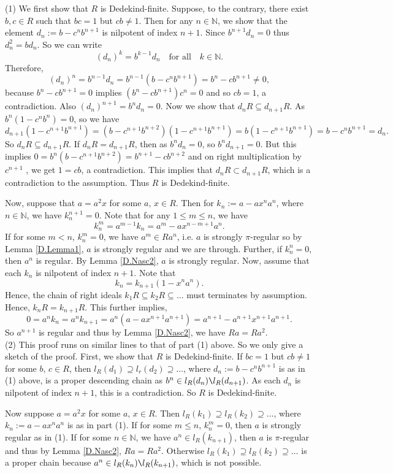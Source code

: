 \documentclass[12pt]{article}
\makeatletter
\theoremstyle{plain}
\theoremstyle{definition}
\renewenvironment{proof}[1][\proofname]{%
	\par\pushQED{\qed}%
	\normalfont %
	\topsep6\p@\@plus6\p@\relax
	\trivlist
	\item[\hskip\labelsep\bfseries #1\@addpunct{.}]%
}{%
	\popQED\endtrivlist\@endpefalse
}
\renewcommand{\proofname}{Proof}
\makeatother
\begin{document}
	\begin{proof}
		(1) We first show that $R$ is Dedekind-finite. Suppose, to the contrary, there exist $b,c \in R$ such that $bc = 1$ but $cb \neq 1$. Then for any $n \in \mathbb{N}$, we show that the element $d_n := b-c^nb^{n+1}$ is nilpotent of index $n+1$. Since $b^{n+1}d_n=0$ thus $d_n^2=bd_n$. So we can write $$(d_n)^k = b^{k-1}d_n  \quad \text{for all} \quad k \in \mathbb{N}.$$ Therefore, $$(d_{n})^n = b^{n-1}d_n = b^{n-1}(b-c^nb^{n+1}) = b^n - cb^{n+1} \neq 0,$$ because $b^n - cb^{n+1} = 0$ implies $(b^n - cb^{n+1})c^n = 0$ and so $cb = 1$, a contradiction. Also $(d_{n})^{n+1} = b^nd_n = 0$. Now we show that $d_nR \subseteq d_{n+1}R$. As $b^n(1-c^nb^n) = 0$, so we have  $$d_{n+1}(1-c^{n+1}b^{n+1}) = (b-c^{n+1}b^{n+2})(1-c^{n+1}b^{n+1}) = b(1-c^{n+1}b^{n+1}) = b - c^{n}b^{n+1} = d_n.$$ So $d_nR \subseteq d_{n+1}R$. If $d_nR = d_{n+1}R$, then as $b^nd_n = 0$, so $b^nd_{n+1} = 0$. But this implies $0 = b^n(b-c^{n+1}b^{n+2}) = b^{n+1} - cb^{n+2}$ and on right multiplication by $c^{n+1}$ , we get $1 = cb$, a contradiction. This implies that  $d_nR \subset d_{n+1}R$, which is a contradiction to the assumption. Thus $R$ is Dedekind-finite. 
		
		Now, suppose that $a = a^2x$ for some $a,\,x\in R$. Then for $k_n := a - ax^na^n$, where $n \in \mathbb{N}$, we have $k_{n}^{n+1} =0$. Note that for any $1 \leq m \leq n$, we have  $$k_n^m = a^{m-1}k_n= a^m-ax^{n-m+1}a^n.$$ If for some $m < n$, $k_{n}^{m} = 0$, we have $a^m \in Ra^n$, i.e. $a$ is strongly $\pi$-regular so by Lemma \ref{D.Lemma1}, $a$ is strongly regular and we are through. Further, if $k_n^n=0$, then $a^n$ is regular. By Lemma \ref{D.Nasc2}, $a$ is strongly regular. Now, assume that each $k_n$ is nilpotent of index $n+1$. Note that $$k_n = k_{n+1}(1-x^na^n).$$ Hence, the chain of right ideals $k_1R \subseteq k_2R \subseteq \ldots$ must terminates by assumption. Hence, $k_nR = k_{n+1}R$. This further implies, $$0= a^nk_n=a^nk_{n+1}=a^n(a - ax^{n+1}a^{n+1}) = a^{n+1} - a^{n+1}x^{n+1}a^{n+1}.$$  So $a^{n+1}$ is regular and thus by Lemma \ref{D.Nasc2}, we have $Ra = Ra^2$. \\[3mm]
		(2) This proof runs on similar lines to that of part (1) above. So we only give a sketch of the proof. First, we show that $R$ is Dedekind-finite. If $bc = 1$ but $cb \neq 1$ for some $b,\,c \in R$, then $l_R(d_1) \supseteq l_r(d_2) \supseteq \ldots$, where $d_n:= b-c^nb^{n+1}$ is as in (1) above, is a proper descending chain as $b^n \in l_R(d_n) \verb=\= l_R(d_{n+1})$. As each $d_n$ is nilpotent of index $n+1$, this is a contradiction. So $R$ is Dedekind-finite. 
		
		Now suppose $a = a^2x$ for some $a,\,x\in R$.  Then $l_R(k_1) \supseteq l_R(k_2) \supseteq \ldots$, where $k_n := a - ax^na^n$ is as in part (1). If for some $m \leq n$, $k_{n}^{m} = 0$, then $a$ is strongly regular as in (1). If for some $n \in \mathbb{N}$, we have $a^n \in l_R(k_{n+1})$, then $a$ is $\pi$-regular and thus by Lemma \ref{D.Nasc2}, $Ra = Ra^2$. Otherwise $l_R(k_1) \supseteq l_R(k_2) \supseteq \ldots$ is a proper chain because $a^n \in l_R(k_n) \verb=\= l_R(k_{n+1})$, which is not possible.
	\end{proof}
	
\end{document}

